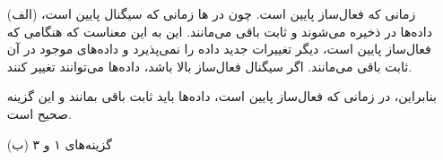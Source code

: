 \begin{enumerate}
	\item [(الف)]
	زمانی که فعال‌ساز پایین است. چون در  ها زمانی که سیگنال  پایین است، داده‌ها در  ذخیره می‌شوند و ثابت باقی می‌مانند. این به این معناست که  هنگامی که فعال‌ساز پایین است، دیگر تغییرات جدید داده را نمی‌پذیرد و داده‌های موجود در آن ثابت باقی می‌مانند. اگر سیگنال فعال‌ساز بالا باشد، داده‌ها می‌توانند تغییر کنند.
	
	بنابراین، در زمانی که فعال‌ساز پایین است، داده‌ها باید ثابت باقی بمانند و این گزینه صحیح است.
	
	
	
	\item [(ب)]
	گزینه‌های ۱ و ۳
\end{enumerate}